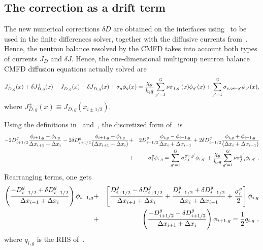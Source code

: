 %
\subsection{The correction as a drift term}
\label{sec:corr-drift}

The new numerical corrections $\delta D$ are obtained on the interfaces using~ to be used in the finite differences solver, together with the diffusive currents from~. Hence, the neutron balance resolved by the CMFD takes into account both types of currents $J_D$ and $\delta J$. %
Hence, the one-dimensional multigroup neutron balance CMFD diffusion equations actually solved are
\begin{equation}\label{eq:diff1}
J_{D,g}^+(x) + \delta J_{D,g}^+(x) -  J_{D,g}^-(x) - \delta J_{D,g}^-(x) + \sigma_{g}\phi_g(x) =  \frac{\chi_g}{{k_{\textrm{\scriptsize{eff}}}}}\sum\limits_{g'=1}^G\nu\sigma_{f,g'}(x)\phi_{g'}(x) + \sum\limits_{g'=1}^G\sigma_{s,g\leftarrow g'}\phi_{g'}(x) ,
\end{equation}
where $J_{D,g}^\pm (x)\equiv J_{D,g}(x_{i\pm 1/2})$.

Using the definitions in~ and~, the discretized form of~ is
\begin{eqnarray}\label{eq:FD_diff_full}
- 2D_{i+1/2}^g\frac{\phi_{i+1,g}-\phi_{i,g}}{\Delta x_{i+1} + \Delta x_i}
- 2\delta D_{i+1/2}^g\frac{\phi_{i+1,g}+\phi_{i,g}}{(\Delta x_{i+1}+\Delta x_i)}
&+& 2D_{i-1/2}^g\frac{\phi_{i,g}-\phi_{i-1,g}}{\Delta x_{i} + \Delta x_{i-1}}  
+ 2\delta D_{i-1/2}^g\frac{\phi_{i,g}+\phi_{i-1,g}}{(\Delta x_i+\Delta x_{i-1})} 
\nonumber \\
&+& \sigma_{i}^g \phi_{i,g} 
= \sum\limits_{g'=1}^G \sigma_{s,i}^{g\leftarrow g'}\phi_{i,g'}
+ \frac{\chi_g}{{k_{\textrm{\scriptsize{eff}}}}}\sum\limits_{g'=1}^G
 \nu\sigma_{f,i}^{g'}\phi_{i,g'} 
\,\,.
\end{eqnarray}
Rearranging terms, one gets
\begin{eqnarray}\label{eq:FD_diff_org}
\left(
\frac{-D_{i-1/2}^g + \delta D_{i-1/2}^g }{\Delta x_{i-1}+\Delta x_{i}}
\right)
\phi_{i-1,g}
&+&\left[
\frac{D_{i+1/2}^g - \delta D_{i+1/2}^g}{\Delta x_{i+1}+\Delta x_i}
+\frac{D_{i-1/2}^g + \delta D_{i-1/2}^g}{\Delta x_{i}+\Delta x_{i-1}}
+\frac{\sigma_{i}^g}{2}
\right]
\phi_{i,g}
\nonumber \\
&+&\left(
\frac{-D_{i+1/2}^g -\delta D_{i+1/2}^g }{\Delta x_{i+1}+\Delta x_{i}}
\right)
\phi_{i+1,g} =
\frac{1}{2}q_{i,g}\,\, ,
\end{eqnarray}
where $q_{i,g}$ is the RHS of~.

